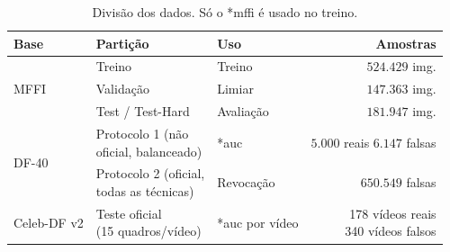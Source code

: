 \documentclass[10pt,conference]{IEEEtran}
\makeatletter
\newcommand{\acr@use}[2]{%
  \@ifundefined{acr@short@#1}{\textbf{??#1??}}{%
    \@ifundefined{acr@used@#1}{%
      \ifnum#2=0 \csname acr@long@#1\endcsname\else\csname acr@longpl@#1\endcsname\fi
      ~(\csname acr@short@#1\endcsname\ifnum#2=1 s\fi)%
      \expandafter\gdef\csname acr@used@#1\endcsname{}%
    }{%
      \csname acr@short@#1\endcsname\ifnum#2=1 s\fi
    }}%
}
\DeclareRobustCommand{\gls}{\@ifstar{\acr@use@s}{\acr@use@s}}
\newcommand{\acr@use@s}[1]{\acr@use{#1}{0}}
\makeatother
\begin{document}
\begin{table}[!htb]
\centering
\caption{Divisão dos dados. Só o \gls*{mffi} é usado no treino.}
\label{tab:bases}
\scriptsize
\setlength{\tabcolsep}{4pt}
\begin{tabular}{@{}lllr@{}}
\toprule
Base & Partição & Uso & Amostras \\
\midrule
\multirow{3}{*}{MFFI} & Treino & Treino & $524.429$ img. \\
 & Validação & Limiar & $147.363$ img. \\
 & Test / Test-Hard & Avaliação & $181.947$ img. \\
\midrule
\multirow{2}{*}{DF-40} & \makecell[l]{Protocolo 1 (não\\oficial, balanceado)} & \gls*{auc} & \makecell[r]{$5.000$ reais\\$6.147$ falsas} \\
 & \makecell[l]{Protocolo 2 (oficial,\\todas as técnicas)} & Revocação & $650.549$ falsas \\
\midrule
Celeb-DF v2 & \makecell[l]{Teste oficial\\(15 quadros/vídeo)} & \gls*{auc} por vídeo & \makecell[r]{178 vídeos reais\\340 vídeos falsos} \\
\bottomrule
\end{tabular}
\end{table}
\end{document}
